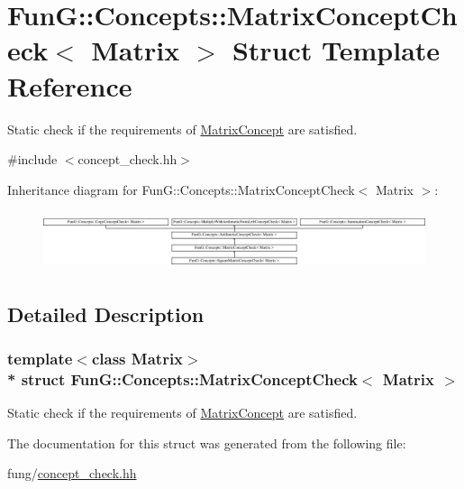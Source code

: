 \hypertarget{structFunG_1_1Concepts_1_1MatrixConceptCheck}{}\section{FunG\+:\+:Concepts\+:\+:Matrix\+Concept\+Check$<$ Matrix $>$ Struct Template Reference}
\label{structFunG_1_1Concepts_1_1MatrixConceptCheck}


Static check if the requirements of \hyperlink{structFunG_1_1Concepts_1_1MatrixConcept}{Matrix\+Concept} are satisfied.  




{\ttfamily \#include $<$concept\+\_\+check.\+hh$>$}

Inheritance diagram for FunG\+:\+:Concepts\+:\+:Matrix\+Concept\+Check$<$ Matrix $>$\+:\begin{figure}[H]
\begin{center}
\leavevmode
\includegraphics[height=1.728395cm]{structFunG_1_1Concepts_1_1MatrixConceptCheck}
\end{center}
\end{figure}


\subsection{Detailed Description}
\subsubsection*{template$<$class Matrix$>$\\*
struct Fun\+G\+::\+Concepts\+::\+Matrix\+Concept\+Check$<$ Matrix $>$}

Static check if the requirements of \hyperlink{structFunG_1_1Concepts_1_1MatrixConcept}{Matrix\+Concept} are satisfied. 

The documentation for this struct was generated from the following file\+:\begin{DoxyCompactItemize}
\item 
fung/\hyperlink{concept__check_8hh}{concept\+\_\+check.\+hh}\end{DoxyCompactItemize}
